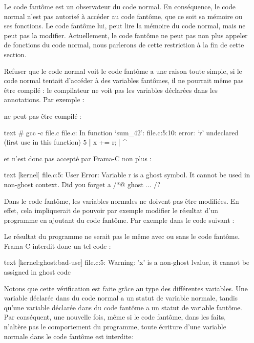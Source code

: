 

Le code fantôme est un observateur du code normal. En conséquence, le code normal
n'est pas autorisé à accéder au code fantôme, que ce soit sa mémoire ou ses
fonctions. Le code fantôme lui, peut lire la mémoire du code normal, mais ne peut
pas la modifier. Actuellement, le code fantôme ne peut pas non plus appeler de
fonctions du code normal, nous parlerons de cette restriction à la fin de cette
section.


Refuser que le code normal voit le code fantôme a une raison toute simple, si le
code normal tentait d'accéder à des variables fantômes, il ne pourrait même pas
être compilé : le compilateur ne voit pas les variables déclarées dans les
annotations. Par exemple :




ne peut pas être compilé :


\begin{CodeBlock}{text}
# gcc -c file.c
file.c: In function ‘sum_42’:
file.c:5:10: error: ‘r’ undeclared (first use in this function)
    5 |     x += r;
      |          ^
\end{CodeBlock}


et n'est donc pas accepté par Frama-C non plus :


\begin{CodeBlock}{text}
[kernel] file.c:5: User Error:
  Variable r is a ghost symbol. It cannot be used in non-ghost context. Did you forget a /*@ ghost ... /?
\end{CodeBlock}


Dans le code fantôme, les variables normales ne doivent pas être modifiées. En effet,
cela impliquerait de pouvoir par exemple modifier le résultat d'un programme en
ajoutant du code fantôme. Par exemple dans le code suivant :




Le résultat du programme ne serait pas le même avec ou sans le code fantôme.
Frama-C interdit donc un tel code :


\begin{CodeBlock}{text}
[kernel:ghost:bad-use] file.c:5: Warning:
  'x' is a non-ghost lvalue, it cannot be assigned in ghost code
\end{CodeBlock}


Notons que cette vérification est faite grâce au type des différentes variables.
Une variable déclarée dans du code normal a un statut de variable normale, tandis
qu'une variable déclarée dans du code fantôme a un statut de variable fantôme.
Par conséquent, une nouvelle fois, même si le code fantôme, dans les faits,
n'altère pas le comportement du programme, toute écriture d'une variable normale
dans le code fantôme est interdite:



